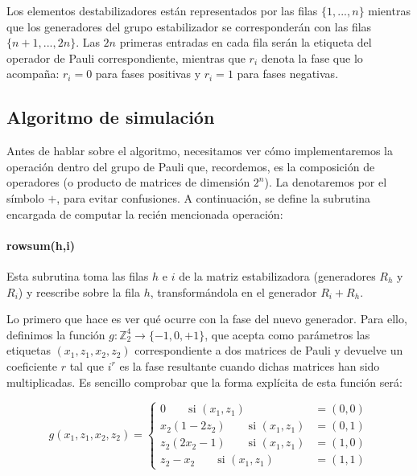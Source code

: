 \documentclass[11pt,a4paper,twoside,pdf]{article}
\numberwithin{equation}{section}
\begin{document}
	Los elementos destabilizadores están representados por las filas $\{1,...,n\}$ mientras que los generadores del grupo estabilizador se corresponderán con las filas $\{n+1,...,2n\}$. Las $2n$ primeras entradas en cada fila serán la etiqueta del operador de Pauli correspondiente, mientras que $r_i$ denota la fase que lo acompaña: $r_i=0$ para fases positivas y $r_i=1$ para fases negativas.
	
	
	
	\subsection{Algoritmo de simulación}
	
	Antes de hablar sobre el algoritmo, necesitamos ver cómo implementaremos la operación dentro del grupo de Pauli que, recordemos, es la composición de operadores (o producto de matrices de dimensión $2^n$). La denotaremos por el símbolo $+$, para evitar confusiones. A continuación, se define la subrutina encargada de computar la recién mencionada operación:
	
			\paragraph{rowsum(h,i)} Esta subrutina toma las filas $h$ e $i$ de la matriz estabilizadora (generadores $R_h$ y $R_i$) y reescribe sobre la fila $h$, transformándola en el generador $R_i+R_h$. 
		
			Lo primero que hace es ver qué ocurre con la fase del nuevo generador. Para ello, definimos la función $g:\mathbb{Z}_2^4 \longrightarrow \{-1,0,+1\}$, que acepta como parámetros las etiquetas $(x_1,z_1,x_2,z_2)$ correspondiente a dos matrices de Pauli y devuelve un coeficiente $r$ tal que $i^r$ es la fase resultante cuando dichas matrices han sido multiplicadas. Es sencillo comprobar que la forma explícita de esta función será:
		
				\begin{equation}
					g(x_1,z_1,x_2,z_2)=\left\lbrace 
						\begin{aligned}
							0  					\qquad	   \text{si } (x_1,z_1) &= (0,0)      \\
							x_2 (1-2z_2)  \qquad	 \text{si } (x_1,z_1) &= (0,1)		  \\
							z_2 (2x_2-1)  \qquad	 \text{si } (x_1,z_1) &= (1,0) 		  \\
							z_2 - x_2		\qquad	   \text{si } (x_1,z_1) &= (1,1)      
						\end{aligned}
				 	\right. 
				\end{equation}
		
\end{document}

